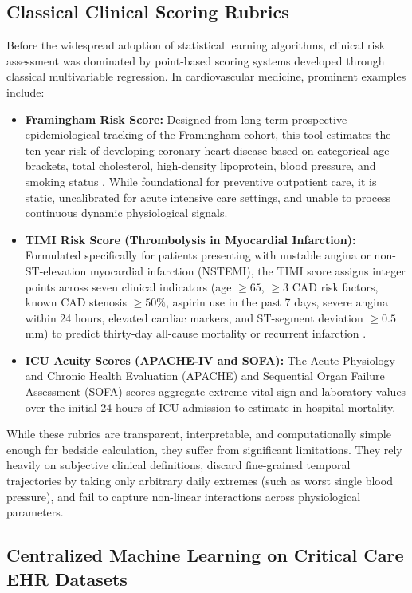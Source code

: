 \documentclass[12pt,a4paper,oneside]{report}
\begin{document}
\subsection{Classical Clinical Scoring Rubrics}
\label{subsec:clinical_scoring}

Before the widespread adoption of statistical learning algorithms, clinical risk assessment was dominated by point-based scoring systems developed through classical multivariable regression. In cardiovascular medicine, prominent examples include:
\begin{itemize}
    \item \textbf{Framingham Risk Score:} Designed from long-term prospective epidemiological tracking of the Framingham cohort, this tool estimates the ten-year risk of developing coronary heart disease based on categorical age brackets, total cholesterol, high-density lipoprotein, blood pressure, and smoking status \citep{krumholz2018cardiovascular}. While foundational for preventive outpatient care, it is static, uncalibrated for acute intensive care settings, and unable to process continuous dynamic physiological signals.
    \item \textbf{TIMI Risk Score (Thrombolysis in Myocardial Infarction):} Formulated specifically for patients presenting with unstable angina or non-ST-elevation myocardial infarction (NSTEMI), the TIMI score assigns integer points across seven clinical indicators (age $\ge 65$, $\ge 3$ CAD risk factors, known CAD stenosis $\ge 50\%$, aspirin use in the past 7 days, severe angina within 24 hours, elevated cardiac markers, and ST-segment deviation $\ge 0.5$ mm) to predict thirty-day all-cause mortality or recurrent infarction \citep{antman2000timi}.
    \item \textbf{ICU Acuity Scores (APACHE-IV and SOFA):} The Acute Physiology and Chronic Health Evaluation (APACHE) and Sequential Organ Failure Assessment (SOFA) scores aggregate extreme vital sign and laboratory values over the initial 24 hours of ICU admission to estimate in-hospital mortality.
\end{itemize}
While these rubrics are transparent, interpretable, and computationally simple enough for bedside calculation, they suffer from significant limitations. They rely heavily on subjective clinical definitions, discard fine-grained temporal trajectories by taking only arbitrary daily extremes (such as worst single blood pressure), and fail to capture non-linear interactions across physiological parameters.

\subsection{Centralized Machine Learning on Critical Care EHR Datasets}
\label{subsec:centralized_ml_ehr}
\end{document}

